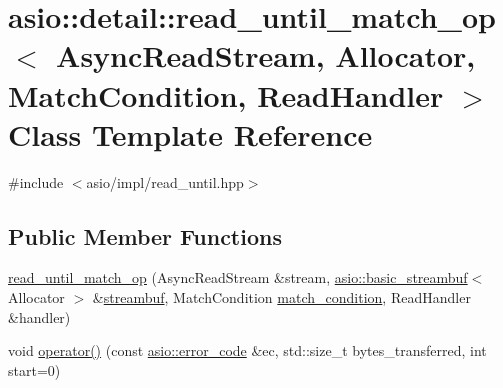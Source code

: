 \hypertarget{classasio_1_1detail_1_1read__until__match__op}{}\section{asio\+:\+:detail\+:\+:read\+\_\+until\+\_\+match\+\_\+op$<$ Async\+Read\+Stream, Allocator, Match\+Condition, Read\+Handler $>$ Class Template Reference}
\label{classasio_1_1detail_1_1read__until__match__op}


{\ttfamily \#include $<$asio/impl/read\+\_\+until.\+hpp$>$}

\subsection*{Public Member Functions}
\begin{DoxyCompactItemize}
\item 
\hyperlink{classasio_1_1detail_1_1read__until__match__op_a77d0200631728a1df9bb388df5f67a82}{read\+\_\+until\+\_\+match\+\_\+op} (Async\+Read\+Stream \&stream, \hyperlink{classasio_1_1basic__streambuf}{asio\+::basic\+\_\+streambuf}$<$ Allocator $>$ \&\hyperlink{namespaceasio_a6a7ba348943527312eeace3492bf32ee}{streambuf}, Match\+Condition \hyperlink{group__async__read__until_ga950b81fb954e4a0f01e13a57e15721b4}{match\+\_\+condition}, Read\+Handler \&handler)
\item 
void \hyperlink{classasio_1_1detail_1_1read__until__match__op_a2b8f2a879ae13c19908522a3435daa06}{operator()} (const \hyperlink{classasio_1_1error__code}{asio\+::error\+\_\+code} \&ec, std\+::size\+\_\+t bytes\+\_\+transferred, int start=0)
\end{DoxyCompactItemize}

